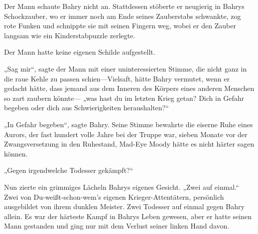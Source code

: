 Der Mann schaute Bahry nicht an. Stattdessen stöberte er neugierig in Bahrys Schockzauber, wo er immer noch am Ende seines Zauberstabs schwankte, zog rote Funken und schnippte sie mit seinen Fingern weg, wobei er den Zauber langsam wie ein Kinderstabpuzzle zerlegte.

Der Mann hatte keine eigenen Schilde aufgestellt.

„Sag mir“, sagte der Mann mit einer uninteressierten Stimme, die nicht ganz in die raue Kehle zu passen schien—Vielsaft, hätte Bahry vermutet, wenn er gedacht hätte, dass jemand aus dem Inneren des Körpers eines anderen Menschen so zart zaubern könnte— „was hast du im letzten Krieg getan? Dich in Gefahr begeben oder dich aus Schwierigkeiten heraushalten?“

„In Gefahr begeben“, sagte Bahry. Seine Stimme bewahrte die eiserne Ruhe eines Aurors, der fast hundert volle Jahre bei der Truppe war, sieben Monate vor der Zwangsversetzung in den Ruhestand, Mad-Eye Moody hätte es nicht härter sagen können.

„Gegen irgendwelche Todesser gekämpft?“

Nun zierte ein grimmiges Lächeln Bahrys eigenes Gesicht. „Zwei auf einmal.“ Zwei von Du-weißt-schon-wem’s eigenen Krieger-Attentätern, persönlich ausgebildet von ihrem dunklen Meister. Zwei Todesser auf einmal gegen Bahry allein. Es war der härteste Kampf in Bahrys Leben gewesen, aber er hatte seinen Mann gestanden und ging nur mit dem Verlust seiner linken Hand davon.

